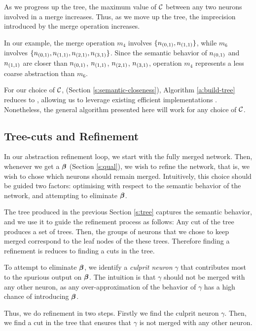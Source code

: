 As we progress up the tree, the maximum value of $\mathcal{C}$ between any two neurons
involved in a merge increases. Thus, as we move up the tree, the imprecision
introduced by the merge operation increases. 

In our example, the merge operation
$m_4$ involves $\{n_{(0,1)}, n_{(1,1)}\}$, while $m_6$ involves $\{n_{(0,1)},
n_{(1,1)}, n_{(2,1)}, n_{(3,1)}\}$. Since the semantic behavior of $n_{(0,1)}$
and $n_{(1,1)}$ are closer than $n_{(0,1)}$, $n_{(1,1)}$, $n_{(2,1)}$,
$n_{(3,1)}$, operation $m_4$ represents a less coarse abstraction than $m_6$.

For our choice of $\mathcal{C}$, (Section \ref{s:semantic-closeness}), Algorithm
\ref{a:build-tree} reduces to \hcluster, allowing us to leverage existing
efficient implementations \cite{scipy-hcluster-linkage}. Nonetheless, the
general algorithm presented here will work for any choice of $\mathcal{C}$.

\subsection{Tree-cuts and Refinement}
\label{s:refinement}



In our abstraction refinement loop, we start with the fully merged network.
Then, whenever we get a \gencex $\boldsymbol{\beta}$ (Section \ref{s:qual}), we wish to
refine the network, that is, we wish to chose which
neurons should remain merged. Intuitively, this choice should be guided
two factors: optimising with respect to the semantic behavior of the network,
and attempting to eliminate $\boldsymbol{\beta}$.

The tree produced in the previous Section \ref{s:tree} captures the semantic
behavior, and we use it to guide the refinement process as follows:
Any cut of the tree produces a set of trees. Then,  
the groups of neurons that we chose to keep merged correspond to the leaf nodes
of the  these trees. Therefore finding a refinement is reduces to finding a cuts
in the tree.

To attempt to eliminate $\boldsymbol{\beta}$, we identify a \textit{culprit neuron}
$\gamma$ that contributes most to the spurious output on $\boldsymbol{\beta}$. The
intuition is that $\gamma$ should not be merged with any other neuron, as any
over-approximation of the behavior of $\gamma$ has a high chance of
introducing $\boldsymbol{\beta}$.

Thus, we do refinement in two steps. Firstly we find the culprit neuron
$\gamma$. Then, we find a cut in the tree that ensures that $\gamma$ is not
merged with any other neuron.


